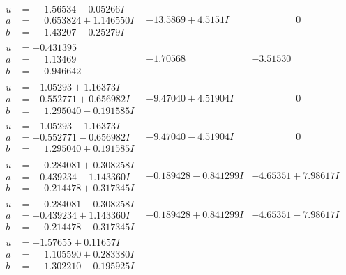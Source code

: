 \documentclass[1p]{elsarticle_modified}
\theoremstyle{definition}
\begin{document}
$$\begin{array}{c|c|c}
\begin{aligned}
u &= \phantom{-}1.56534 - 0.05266 I \\
a &= \phantom{-}0.653824 + 1.146550 I \\
b &= \phantom{-}1.43207 - 0.25279 I\end{aligned}
 & -13.5869 + 4.5151 I & \phantom{-0.000000 } 0 \\ \hline\begin{aligned}
u &= -0.431395\phantom{ +0.000000I} \\
a &= \phantom{-}1.13469\phantom{ +0.000000I} \\
b &= \phantom{-}0.946642\phantom{ +0.000000I}\end{aligned}
 & -1.70568\phantom{ +0.000000I} & -3.51530\phantom{ +0.000000I} \\ \hline\begin{aligned}
u &= -1.05293 + 1.16373 I \\
a &= -0.552771 + 0.656982 I \\
b &= \phantom{-}1.295040 - 0.191585 I\end{aligned}
 & -9.47040 + 4.51904 I & \phantom{-0.000000 } 0 \\ \hline\begin{aligned}
u &= -1.05293 - 1.16373 I \\
a &= -0.552771 - 0.656982 I \\
b &= \phantom{-}1.295040 + 0.191585 I\end{aligned}
 & -9.47040 - 4.51904 I & \phantom{-0.000000 } 0 \\ \hline\begin{aligned}
u &= \phantom{-}0.284081 + 0.308258 I \\
a &= -0.439234 - 1.143360 I \\
b &= \phantom{-}0.214478 + 0.317345 I\end{aligned}
 & -0.189428 - 0.841299 I & -4.65351 + 7.98617 I \\ \hline\begin{aligned}
u &= \phantom{-}0.284081 - 0.308258 I \\
a &= -0.439234 + 1.143360 I \\
b &= \phantom{-}0.214478 - 0.317345 I\end{aligned}
 & -0.189428 + 0.841299 I & -4.65351 - 7.98617 I \\ \hline\begin{aligned}
u &= -1.57655 + 0.11657 I \\
a &= \phantom{-}1.105590 + 0.283380 I \\
b &= \phantom{-}1.302210 - 0.195925 I\end{aligned}

\end{array}$$
\end{document}
